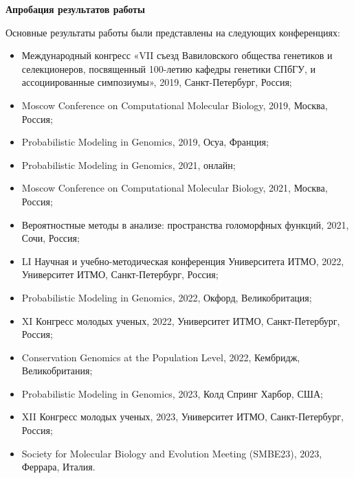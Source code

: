 

\textbf{Апробация результатов работы}

Основные результаты работы были представлены на следующих  конференциях:

\begin{itemize}
    \item Международный конгресс «VII съезд Вавиловского общества генетиков и селекционеров, посвященный 100-летию кафедры генетики СПбГУ, и ассоциированные симпозиумы», 2019, Санкт-Петербург, Россия;
    \item Moscow Conference on Computational Molecular Biology, 2019, Москва, Россия;
    \item Probabilistic Modeling in Genomics, 2019, Осуа, Франция;
    \item Probabilistic Modeling in Genomics, 2021, онлайн;
    \item Moscow Conference on Computational Molecular Biology, 2021, Москва, Россия;
    \item Вероятностные методы в анализе: пространства голоморфных функций, 2021, Сочи, Россия;
    \item LI Научная и учебно-методическая конференция Университета ИТМО, 2022, Университет ИТМО, Санкт-Петербург, Россия;
    \item Probabilistic Modeling in Genomics, 2022, Окфорд, Великобритация;
    \item XI Конгресс молодых ученых, 2022, Университет ИТМО, Санкт-Петербург, Россия;
    \item Conservation Genomics at the Population Level, 2022, Кембридж, Великобритания;
    \item Probabilistic Modeling in Genomics, 2023, Колд Спринг Харбор, США;
    \item XII Конгресс молодых ученых, 2023, Университет ИТМО, Санкт-Петербург, Россия;
    \item Society for Molecular Biology and Evolution Meeting (SMBE23), 2023, Феррара, Италия.\\
\end{itemize}


